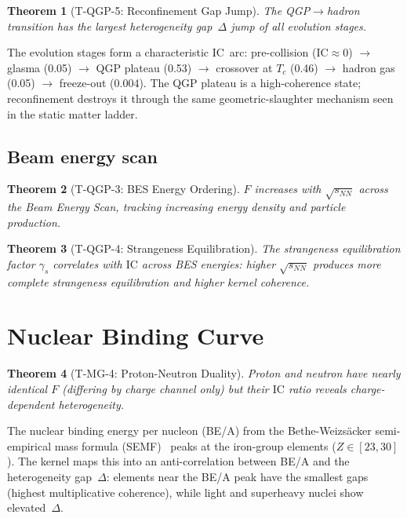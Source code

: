 \documentclass[
  aps,
  prd,
  twocolumn,
  superscriptaddress,
  nofootinbib,
  floatfix
]{revtex4-2}
\newtheorem{theorem}{Theorem}
\newcommand{\IC}{\mathrm{IC}}
\begin{document}
\begin{theorem}[T-QGP-5: Reconfinement Gap Jump]
\label{thm:gapjump}
The QGP$\to$hadron transition has the largest heterogeneity
gap~$\Delta$ jump of all evolution stages.
\end{theorem}

The evolution stages form a characteristic $\IC$~arc:
pre-collision ($\IC \approx 0$) $\to$ glasma (0.05) $\to$
QGP plateau (0.53) $\to$ crossover at $T_c$ (0.46) $\to$
hadron gas (0.05) $\to$ freeze-out (0.004).  The QGP plateau
is a high-coherence state; reconfinement destroys it through
the same geometric-slaughter mechanism seen in the static
matter ladder.

\subsection{Beam energy scan}

\begin{theorem}[T-QGP-3: BES Energy Ordering]
\label{thm:bes}
$F$ increases with $\sqrt{s_{NN}}$ across the Beam Energy
Scan, tracking increasing energy density and particle
production.
\end{theorem}

\begin{theorem}[T-QGP-4: Strangeness Equilibration]
\label{thm:strange}
The strangeness equilibration factor $\gamma_s$ correlates
with $\IC$ across BES energies: higher $\sqrt{s_{NN}}$
produces more complete strangeness equilibration and higher
kernel coherence.
\end{theorem}

\section{Nuclear Binding Curve}\label{sec:binding}

\begin{theorem}[T-MG-4: Proton-Neutron Duality]
\label{thm:pndual}
Proton and neutron have nearly identical $F$ (differing
by charge channel only) but their $\IC$ ratio reveals
charge-dependent heterogeneity.
\end{theorem}

The nuclear binding energy per nucleon (BE/A) from the
Bethe-Weizs\"acker semi-empirical mass formula
(SEMF)~\cite{weizsacker1935,bethe1936} peaks at the
iron-group elements ($Z \in [23, 30]$).  The kernel
maps this into an anti-correlation between BE/A and the
heterogeneity gap~$\Delta$: elements near the BE/A peak
have the smallest gaps (highest multiplicative coherence),
while light and superheavy nuclei show elevated~$\Delta$.
\end{document}
